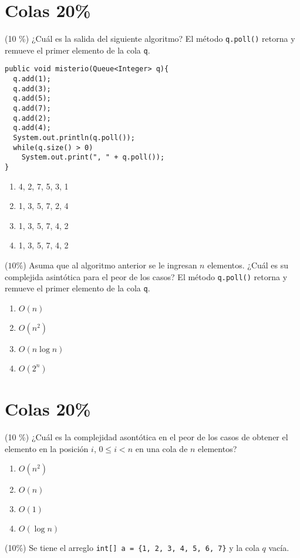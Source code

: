 \documentclass[twocolumn]{article}
\begin{document}
\section{Colas 20\%}
(10 \%) ¿Cuál es la salida del siguiente algoritmo? El método \texttt{q.poll()} retorna y remueve el primer elemento de la cola \texttt{q}.
\begin{verbatim}
public void misterio(Queue<Integer> q){
  q.add(1);
  q.add(3);
  q.add(5);
  q.add(7);
  q.add(2);
  q.add(4);
  System.out.println(q.poll());
  while(q.size() > 0) 
    System.out.print(", " + q.poll());
}
\end{verbatim}
\begin{enumerate}[label=\Alph*.]
\item 4, 2, 7, 5, 3, 1
\item 1, 3, 5, 7, 2, 4
\item 1, 3, 5, 7, 4, 2  
\item 1, 3, 5, 7, 4, 2 \\
\end{enumerate}

($10\%$) \space Asuma que al algoritmo anterior se le ingresan $n$ elementos. ¿Cuál es su complejida asintótica para el peor de los casos? El método \texttt{q.poll()} retorna y remueve el primer elemento de la cola \texttt{q}.
\begin{enumerate}[label=\Alph*.]
\item $O(n)$
\item $O(n^2)$
\item $O(n\log n)$
\item $O(2^n)$
\end{enumerate}


\section{Colas 20\%}
(10 \%) ¿Cuál es la complejidad asontótica en el peor de los casos de obtener el elemento en la posición $i$, $0 \leq i < n$ en una cola de $n$ elementos?\\

\begin{enumerate}[label=\Alph*.]
\item $O(n^2)$
\item $O(n)$
\item $O(1)$
\item $O(\log n)$ \\
\end{enumerate}

(10\%) Se tiene el arreglo \texttt{int[] a = \{1, 2, 3, 4, 5, 6, 7\}} y la cola $q$ vacía. 
\end{document}
